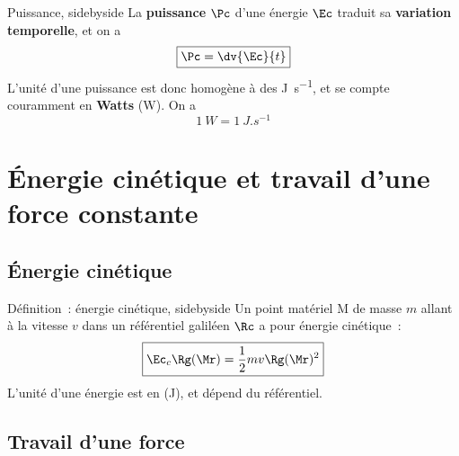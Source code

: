 \documentclass[../main/main.tex]{subfiles}
\begin{document}
\begin{tdefi}{Puissance, sidebyside}
    La \textbf{puissance} $\Pc$ d'une énergie $\Ec$ traduit sa \textbf{variation
    temporelle}, et on a
    \[\boxed{\Pc = \dv{\Ec}{t}}\]
    \tcblower
    L'unité d'une puissance est donc homogène à des \si{J.s^{-1}}, et se compte
    couramment en \textbf{Watts} (W). On a
    \[\boxed{\SI{1}{W} = \SI{1}{J.s^{-1}}}\]
\end{tdefi}

\vspace{-10pt}
\section{Énergie cinétique et travail d'une force constante}
\subsection{Énergie cinétique}

\begin{tdefi}{Définition~: énergie cinétique, sidebyside}
    Un point matériel M de masse $m$ allant à la vitesse $v$ dans un référentiel
    galiléen $\Rc$ a pour énergie cinétique~:
    \[\boxed{\Ec_{c}\Rg(\Mr) = \frac{1}{2}mv\Rg(\Mr)^2}\]
    \tcblower
    L'unité d'une énergie est en  (J), et dépend du référentiel.
\end{tdefi}

\subsection{Travail d'une force}
\end{document}
